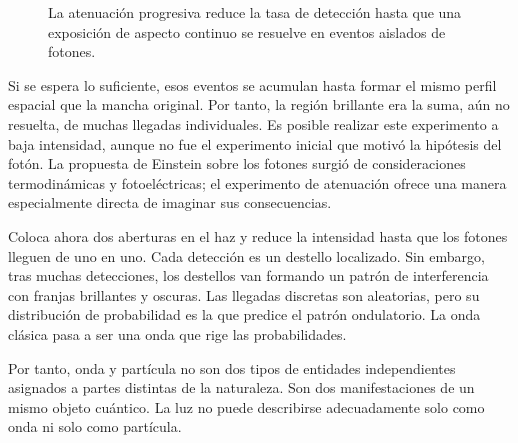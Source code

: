 \begin{figure}[h]
\centering
{}
\caption{La atenuación progresiva reduce la tasa de detección hasta que una exposición de aspecto continuo se resuelve en eventos aislados de fotones.}
\end{figure}

Si se espera lo suficiente, esos eventos se acumulan hasta formar el mismo perfil espacial que la mancha original. Por tanto, la región brillante era la suma, aún no resuelta, de muchas llegadas individuales. Es posible realizar este experimento a baja intensidad, aunque no fue el experimento inicial que motivó la hipótesis del fotón. La propuesta de Einstein sobre los fotones surgió de consideraciones termodinámicas y fotoeléctricas; el experimento de atenuación ofrece una manera especialmente directa de imaginar sus consecuencias.

Coloca ahora dos aberturas en el haz y reduce la intensidad hasta que los fotones lleguen de uno en uno. Cada detección es un destello localizado. Sin embargo, tras muchas detecciones, los destellos van formando un patrón de interferencia con franjas brillantes y oscuras. Las llegadas discretas son aleatorias, pero su distribución de probabilidad es la que predice el patrón ondulatorio. La onda clásica pasa a ser una onda que rige las probabilidades.

Por tanto, onda y partícula no son dos tipos de entidades independientes asignados a partes distintas de la naturaleza. Son dos manifestaciones de un mismo objeto cuántico. La luz no puede describirse adecuadamente solo como onda ni solo como partícula.

